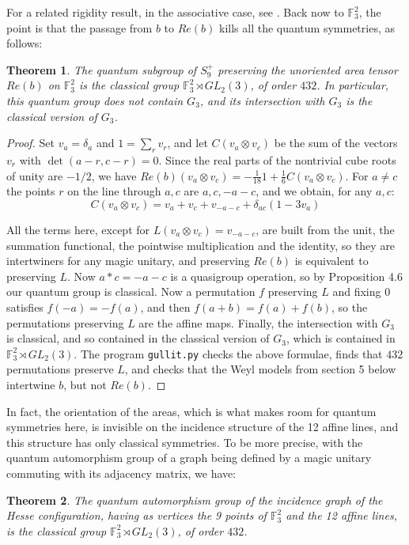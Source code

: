 \documentclass[11pt]{amsart}
\newtheorem{theorem}{Theorem}[section]
\theoremstyle{definition}
\begin{document}
For a related rigidity result, in the associative case, see \cite{ksw}. Back now to $\mathbb F_3^2$, the point is that the passage from $b$ to $Re(b)$ kills all the quantum symmetries, as follows:

\begin{theorem}
The quantum subgroup of $S_9^+$ preserving the unoriented area tensor $Re(b)$ on $\mathbb F_3^2$ is the classical group $\mathbb F_3^2\rtimes GL_2(3)$, of order $432$. In particular, this quantum group does not contain $G_3$, and its intersection with $G_3$ is the classical version of $G_3$.
\end{theorem}

\begin{proof}
Set $v_a=\delta_a$ and $1=\sum_rv_r$, and let $C(v_a\otimes v_c)$ be the sum of the vectors $v_r$ with $\det(a-r,c-r)=0$. Since the real parts of the nontrivial cube roots of unity are $-1/2$, we have $Re(b)(v_a\otimes v_c)=-\frac{1}{18}1+\frac{1}{6}C(v_a\otimes v_c)$. For $a\neq c$ the points $r$ on the line through $a,c$ are $a,c,-a-c$, and we obtain, for any $a,c$:
$$C(v_a\otimes v_c)=v_a+v_c+v_{-a-c}+\delta_{ac}(1-3v_a)$$

All the terms here, except for $L(v_a\otimes v_c)=v_{-a-c}$, are built from the unit, the summation functional, the pointwise multiplication and the identity, so they are intertwiners for any magic unitary, and preserving $Re(b)$ is equivalent to preserving $L$. Now $a*c=-a-c$ is a quasigroup operation, so by Proposition 4.6 our quantum group is classical. Now a permutation $f$ preserving $L$ and fixing $0$ satisfies $f(-a)=-f(a)$, and then $f(a+b)=f(a)+f(b)$, so the permutations preserving $L$ are the affine maps. Finally, the intersection with $G_3$ is classical, and so contained in the classical version of $G_3$, which is contained in $\mathbb F_3^2\rtimes GL_2(3)$. The program {\tt gullit.py} checks the above formulae, finds that $432$ permutations preserve $L$, and checks that the Weyl models from section 5 below intertwine $b$, but not $Re(b)$.
\end{proof}

In fact, the orientation of the areas, which is what makes room for quantum symmetries here, is invisible on the incidence structure of the 12 affine lines, and this structure has only classical symmetries. To be more precise, with the quantum automorphism group of a graph being defined by a magic unitary commuting with its adjacency matrix, we have:

\begin{theorem}
The quantum automorphism group of the incidence graph of the Hesse configuration, having as vertices the 9 points of $\mathbb F_3^2$ and the 12 affine lines, is the classical group $\mathbb F_3^2\rtimes GL_2(3)$, of order $432$.
\end{theorem}
\end{document}
